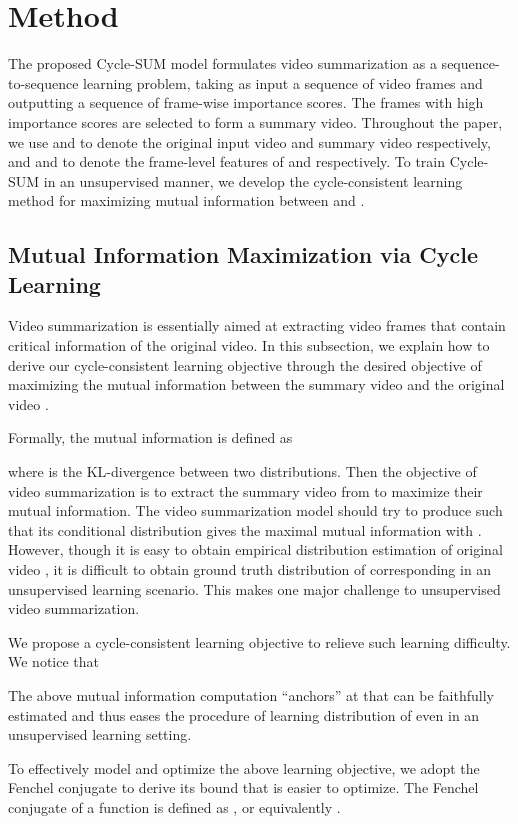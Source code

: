 \documentclass[letterpaper]{article} \usepackage{aaai19}  \usepackage{times}  \usepackage{helvet}  \usepackage{courier}  \usepackage{url}  \usepackage{graphicx}  \frenchspacing  \setlength{\pdfpagewidth}{8.5in}  \setlength{\pdfpageheight}{11in}  \usepackage{amsmath}
\begin{document}
\section{Method}
The proposed Cycle-SUM model formulates video summarization as a sequence-to-sequence learning problem, taking as input a sequence of video frames and outputting a sequence of frame-wise importance scores. The frames with high importance scores are selected to form a summary video. Throughout the paper, we use  and  to denote the original input video and summary video respectively, and  and  to denote the frame-level features of  and  respectively.
To train Cycle-SUM in an unsupervised manner, we develop the cycle-consistent learning method for maximizing mutual information between  and .




\subsection{Mutual Information Maximization via Cycle Learning}
Video summarization is essentially aimed at extracting video frames that contain critical information of the original video. In this subsection, we explain how to derive our cycle-consistent learning objective through the desired objective of maximizing the mutual information between the summary video  and the original video .

Formally, the mutual information  is defined as

where  is the KL-divergence between two distributions. Then the objective of video summarization is to extract the summary video  from  to maximize their mutual information. The video summarization model should try to produce  such that its  conditional distribution  gives the maximal mutual information with .  However, though it is easy to obtain empirical distribution estimation of original video , it is difficult to obtain ground truth distribution  of corresponding  in an unsupervised learning scenario. This makes one major challenge to unsupervised video summarization.

We propose a cycle-consistent learning objective to relieve such learning difficulty. We notice that

The above mutual information computation ``anchors'' at  that can be faithfully estimated and thus eases the procedure of learning distribution of  even in an unsupervised learning setting.

To effectively model and optimize the above learning objective, we adopt the Fenchel conjugate to derive its  bound that is easier to optimize. The Fenchel conjugate of a function  is defined as
,
or equivalently
.
\end{document}
